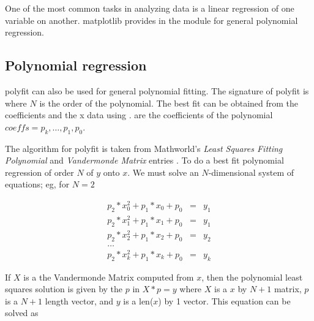 \documentclass[twoside]{book}
\begin{document}
One of the most common tasks in analyzing data is a linear regression
of one variable on another.  matplotlib provides  in the
 module for general polynomial regression.





\subsection{Polynomial regression}
\label{cbook:polynomial_regression}

polyfit can also be used for general polynomial fitting.  The
signature of polyfit is  where $N$ is
the order of the polynomial.  The best fit can be obtained from the
coefficients and the x data using .
 are the coefficients of the polynomial $coeffs = p_k,
\dots, p_1, p_0$.


The algorithm for polyfit is taken from Mathworld's \textit{Least
  Squares Fitting Polynomial} and \textit{Vandermonde Matrix} entries
\citep{Weisstein2002}.
To do a best fit polynomial regression of order $N$ of $y$ onto $x$.
We must solve an $N$-dimensional system of equations; eg, for $N=2$

\begin{eqnarray}
  \label{eq:polysys}
      p_2*x_0^2 +  p_1*x_0 + p_0 &=& y_1\nonumber\\
      p_2*x_1^2 +  p_1*x_1 + p_0 &=& y_1\nonumber\\
      p_2*x_2^2 +  p_1*x_2 + p_0 &=& y_2\nonumber\\
      \dots & \nonumber\\
      p_2*x_k^2 +  p_1*x_k + p_0 &=& y_k\nonumber
\end{eqnarray}

\noindent If $X$ is a the Vandermonde Matrix computed from $x$, then the
polynomial least squares solution is given by the $p$ in $X*p = y$
where $X$ is a $x$ by $N+1$ matrix, $p$ is a $N+1$ length vector, and
$y$ is a len($x$) by 1 vector.  This equation can be solved as
\end{document}

